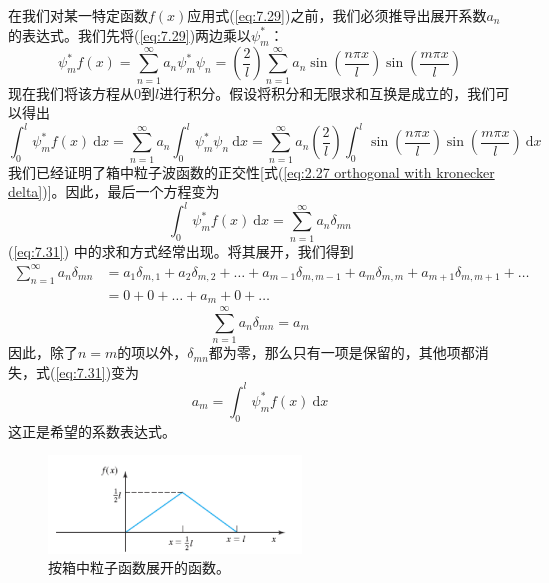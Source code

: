     在我们对某一特定函数$f\left(x\right)$应用式(\ref{eq:7.29})之前，我们必须推导出展开系数$a_n$的表达式。我们先将(\ref{eq:7.29})两边乘以$\psi_m^{\ast}$：
    \begin{equation}
        \psi_m^{\ast} f\left(x\right) = \sum_{n=1}^{\infty} a_n \psi_m^{\ast} \psi_n = \left(\frac{2}{l}\right) \sum_{n=1}^{\infty} a_n \sin\left(\frac{n\pi x}{l}\right) \sin\left(\frac{m\pi x}{l}\right)
        \label{eq:7.30}
    \end{equation}
    现在我们将该方程从$0$到$l$进行积分。假设将积分和无限求和互换是成立的，我们可以得出
    \begin{equation*}
        \int_{0}^{l} \psi_m^{\ast} f\left(x\right) \: \mathrm{d}x = \sum_{n=1}^{\infty} a_n \int_{0}^{l} \psi_m^{\ast} \psi_n \: \mathrm{d}x = \sum_{n=1}^{\infty} a_n \left(\frac{2}{l}\right) \int_{0}^{l} \sin\left(\frac{n\pi x}{l}\right) \sin\left(\frac{m\pi x}{l}\right) \: \mathrm{d}x
    \end{equation*}
    我们已经证明了箱中粒子波函数的正交性[式(\ref{eq:2.27 orthogonal with kronecker delta})]。因此，最后一个方程变为
    \begin{equation}
        \int_{0}^{l} \psi_m^{\ast} f\left(x\right) \: \mathrm{d}x = \sum_{n=1}^{\infty} a_n \delta_{mn}
        \label{eq:7.31}
    \end{equation}
    (\ref{eq:7.31}) 中的求和方式经常出现。将其展开，我们得到
    \begin{equation*}
        \begin{aligned}
            \sum_{n=1}^{\infty}a_n \delta_{mn} &= a_1 \delta_{m,1} + a_2 \delta_{m,2} + \ldots + a_{m-1} \delta_{m,m-1} + a_m \delta_{m,m} + a_{m+1} \delta_{m,m+1} + \ldots \\
            &= 0 + 0 + \ldots + a_m + 0 + \ldots
        \end{aligned}
    \end{equation*}
    \begin{equation}
        \sum_{n=1}^{\infty} a_n \delta_{mn} = a_m
        \label{eq:7.32}
    \end{equation}
    因此，除了$n=m$的项以外，$\delta_{mn}$都为零，那么只有一项是保留的，其他项都消失，式(\ref{eq:7.31})变为
    \begin{equation}
        a_m = \int_{0}^{l} \psi_m^{\ast} f\left(x\right) \: \mathrm{d}x
        \label{eq:7.33}
    \end{equation}
    这正是希望的系数表达式。
    \begin{figure}[h!]
        \centering
        \includegraphics[width=0.6\textwidth]{figures/7.1.png}
        \caption{按箱中粒子函数展开的函数。}
        \label{fig:7.1}
    \end{figure}

